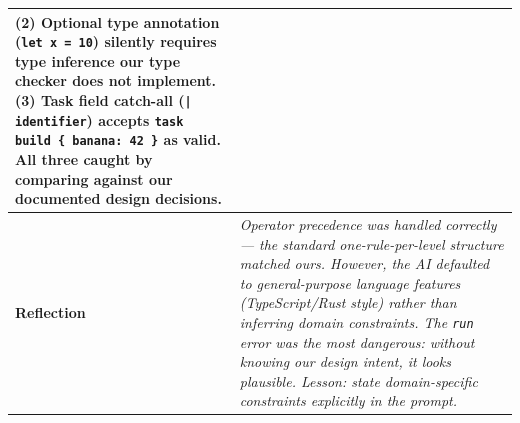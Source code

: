 \documentclass[a4paper,10pt]{article}
\begin{document}
\begin{tabular}{|
    >{\bfseries}m{3.5cm}|
    m{10cm}|
}
    \newline
    \textbf{(2)} Optional type annotation (\texttt{let x = 10}) silently
    requires type inference our type checker does not implement.
    \newline
    \textbf{(3)} Task field catch-all (\texttt{| identifier}) accepts
    \texttt{task build \{ banana: 42 \}} as valid.
    \newline
    All three caught by comparing against our documented design decisions. \\
\hline
\rowcolor{white}
Reflection & \textit{Operator precedence was handled correctly --- the standard one-rule-per-level
    structure matched ours.
    However, the AI defaulted to general-purpose language features
    (TypeScript/Rust style) rather than inferring domain constraints.
    The \texttt{run} error was the most dangerous: without knowing our
    design intent, it looks plausible.
    Lesson: state domain-specific constraints explicitly in the prompt.} \\
\hline
\end{tabular}
\end{document}
